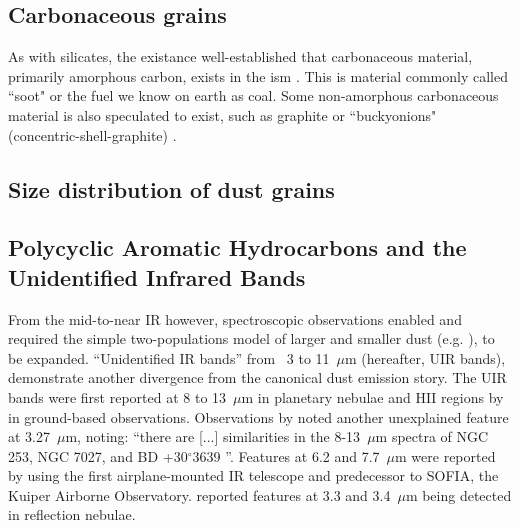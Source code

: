\subsection{Carbonaceous grains}
      As with silicates, the existance well-established that carbonaceous material, primarily amorphous carbon, exists in the \acrshort{ism} \citep{aitken81,tielens87}. This is material commonly called ``soot" or the fuel we know on earth as coal.    Some non-amorphous carbonaceous material is also speculated to exist, such as graphite \citep{zhou06} or ``buckyonions" (concentric-shell-graphite) \citep{li08}.

\subsection{Size distribution of dust grains}


\subsection{Polycyclic Aromatic Hydrocarbons and the Unidentified Infrared Bands}

    From the mid-to-near IR however, spectroscopic observations enabled and required the simple two-populations model of larger and smaller dust (e.g. \cite{mathis77}), to be expanded. ``Unidentified IR bands'' from~ 3 to 11~$\mu$m (hereafter, UIR bands), demonstrate another divergence from the canonical dust emission story. The UIR bands were first reported at 8 to 13~$\mu$m in planetary nebulae and HII regions by \cite{gillet73, gillett75} in ground-based observations. Observations by \cite{merrill75} noted another unexplained feature at 3.27~$\mu$m, noting: ``there are [...] similarities in the 8-13~$\mu$m spectra of NGC 253, NGC 7027, and BD +30$^\circ$3639 \cite{gillett75}''. Features at 6.2 and 7.7~$\mu$m were reported by \cite{russell77b} using the first airplane-mounted IR telescope and predecessor to SOFIA, the Kuiper Airborne Observatory. \cite{sellgren83} reported features at 3.3 and 3.4~$\mu$m being detected in reflection nebulae.

